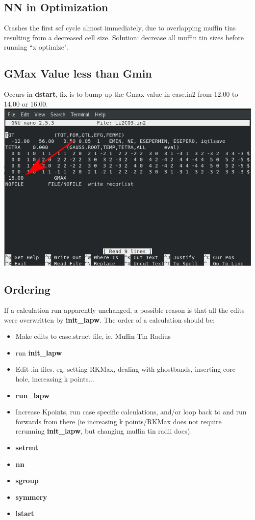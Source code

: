 \documentclass[12pt]{article}
\begin{document}
\subsection{NN in Optimization}
Crashes the first scf cycle almost immediately, due to overlapping muffin tins resulting from a decreased cell size.  Solution: decrease all muffin tin sizes before running ``x optimize".


\subsection{GMax Value less than Gmin}

Occurs in \textbf{dstart}, fix is to bump up the Gmax value in case.in2 from 12.00 to 14.00 or 16.00.
\includegraphics[scale=0.5]{./images/gmax_err.png}

\subsection{Ordering}
If a calculation run apparently unchanged, a possible reason is that all the edits were overwritten by \textbf{init\_lapw}.  The order of a calculation should be: 
\begin{itemize}
	\item Make edits to case.struct file, ie. Muffin Tin Radius
	\item run \textbf{init\_lapw}
	\item  Edit .in files. eg. setting RKMax, dealing with ghostbands, inserting core hole, increasing k points...
	\item \textbf{run\_lapw}
	\item Increase Kpoints, run case specific calculations,  and/or loop back to and run forwards from there (ie increasing k points/RKMax does not require rerunning \textbf{init\_lapw}, but changing muffin tin radii does).
\end{itemize}



\begin{itemize}
	\item \textbf{setrmt}
	\item \textbf{nn}
	\item \textbf{sgroup}
	\item  \textbf{symmery}
	\item \textbf{lstart}
	
\end{itemize}
\end{document}
